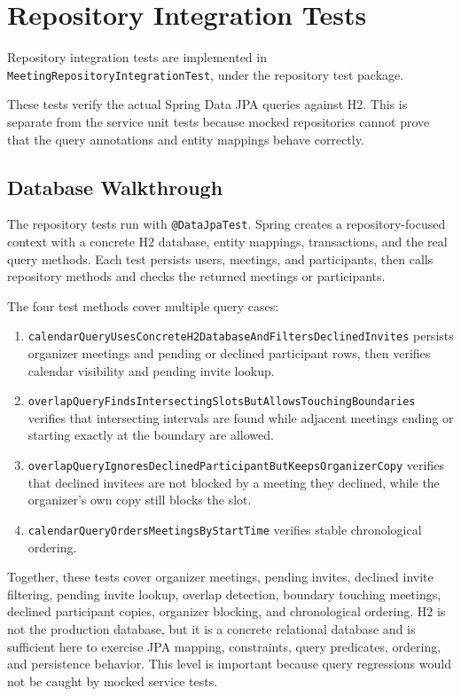 \chapter{Repository Integration Tests} \label{cap:repository}

Repository integration tests are implemented in \texttt{MeetingRepositoryIntegrationTest}, under the repository test package.

These tests verify the actual Spring Data JPA queries against H2. This is separate from the service unit tests because mocked repositories cannot prove that the query annotations and entity mappings behave correctly.

\section{Database Walkthrough}

The repository tests run with \texttt{@DataJpaTest}. Spring creates a repository-focused context with a concrete H2 database, entity mappings, transactions, and the real query methods. Each test persists users, meetings, and participants, then calls repository methods and checks the returned meetings or participants.

The four test methods cover multiple query cases:

\begin{enumerate}
\item \texttt{calendarQueryUsesConcreteH2DatabaseAndFiltersDeclinedInvites} persists organizer meetings and pending or declined participant rows, then verifies calendar visibility and pending invite lookup.
\item \texttt{overlapQueryFindsIntersectingSlotsButAllowsTouchingBoundaries} verifies that intersecting intervals are found while adjacent meetings ending or starting exactly at the boundary are allowed.
\item \texttt{overlapQueryIgnoresDeclinedParticipantButKeepsOrganizerCopy} verifies that declined invitees are not blocked by a meeting they declined, while the organizer's own copy still blocks the slot.
\item \texttt{calendarQueryOrdersMeetingsByStartTime} verifies stable chronological ordering.
\end{enumerate}

Together, these tests cover organizer meetings, pending invites, declined invite filtering, pending invite lookup, overlap detection, boundary touching meetings, declined participant copies, organizer blocking, and chronological ordering. H2 is not the production database, but it is a concrete relational database and is sufficient here to exercise JPA mapping, constraints, query predicates, ordering, and persistence behavior. This level is important because query regressions would not be caught by mocked service tests.
